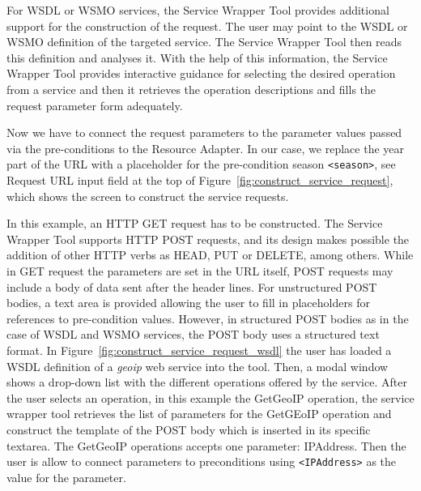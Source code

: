 \documentclass{fast_latex}
\begin{document}
For WSDL or WSMO services, the Service Wrapper Tool provides additional support for the construction of the request. The user may point to the WSDL or WSMO definition of the targeted service. The Service Wrapper Tool then reads this definition and analyses it. With the help of this information, the Service Wrapper Tool provides interactive guidance for selecting the desired operation from a service and then it retrieves the operation descriptions and fills the request parameter form adequately.

Now we have to connect the request parameters to the parameter values passed via the pre-conditions to the Resource Adapter. In our case, we replace the year part of the URL with a placeholder for the pre-condition season \verb|<season>|, see Request URL input field at the top of Figure~\ref{fig:construct_service_request}, which shows the screen to construct the service requests.

In this example, an HTTP GET request has to be constructed. The Service Wrapper Tool supports HTTP POST requests, and its design makes possible the addition of other HTTP verbs as HEAD, PUT or DELETE, among others. While in GET request the parameters are set in the URL itself, POST requests may include a body of data sent after the header lines. For unstructured POST bodies, a text area is provided allowing the user to fill in placeholders for references to pre-condition values. However, in structured POST bodies as in the case of WSDL and WSMO services, the POST body uses a structured text format. In Figure~\ref{fig:construct_service_request_wsdl} the user has loaded a WSDL definition of a \emph{geoip} web service into the tool. Then, a modal window shows a drop-down list with the different operations offered by the service. After the user selects an operation, in this example the GetGeoIP operation, the service wrapper tool retrieves the list of parameters for the GetGEoIP operation and construct the template of the POST body which is inserted in its specific textarea. The GetGeoIP operations accepts one parameter: IPAddress. Then the user is allow to connect parameters to preconditions using \verb|<IPAddress>| as the value for the parameter. 
\end{document}
